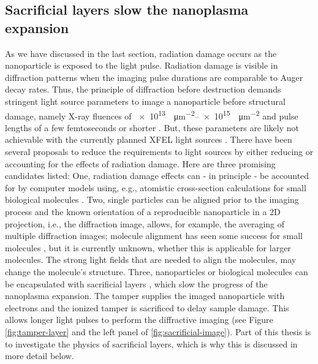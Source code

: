 \subsection{Sacrificial layers slow the nanoplasma expansion}\label{sec:tampered-layers}
%
%
%
As we have discussed in the last section, radiation damage occurs as the nanoparticle is exposed to the light pulse. Radiation damage is visible in diffraction patterns when the imaging pulse durations are comparable to Auger decay rates. Thus, the principle of diffraction before destruction \citep{Neutze-2000-Nature} demands stringent light source parameters to image a nanoparticle before structural damage, namely X-ray fluences of \SIrange{e13}{e15}{\photons\per\square\micro\meter} and pulse lengths of a few femtoseconds or shorter \citep{Hau-Riege-2005-PRE}. But, these parameters are likely not achievable with the currently planned XFEL light sources \cite{Huldt-2003-JSB}. There have been several proposals to reduce the requirements to light sources \citep{Aquila-2015-StrucDyn} by either reducing or accounting for the effects of radiation damage. Here are three promising candidates listed: One, radiation damage effects can - in principle - be accounted for by computer models using, e.g., atomistic cross-section calculations for small biological molecules \cite{Ho-2016-PRA,Quiney-2010-NatPhys,Yoon-2016-scirep}. Two, single particles can be aligned prior to the imaging process \citep{Hau-Riege-2005-PRE} and the known orientation of a reproducible nanoparticle in a 2D projection, i.e., the diffraction image, allows, for example, the averaging of multiple diffraction images; molecule alignment has seen some success for small molecules \citep{Kupper-2014-PRL}, but it is currently unknown, whether this is applicable for larger molecules. The strong light fields that are needed to align the molecules, may change the molecule's structure. Three, nanoparticles or biological molecules can be encapsulated with sacrificial layers \citep{Hau-Riege-2007-PRL,Jurek-2008-EPJ,Jurek-2009-EPL}, which slow the progress of the nanoplasma expansion. The tamper supplies the imaged nanoparticle with electrons and the ionized tamper is sacrificed to delay sample damage. This allows longer light pulses to perform the diffractive imaging (see Figure \ref{fig:tamper-layer} and the left panel of \ref{fig:sacrificial-image}). Part of this thesis is to investigate the physics of sacrificial layers, which is why this is discussed in more detail below.\\[1\baselineskip]
